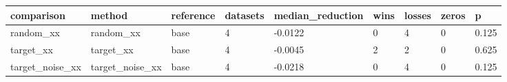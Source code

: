 \begin{tabular}{lllllllll}
\toprule
comparison & method & reference & datasets & median\_reduction & wins & losses & zeros & p \\
\midrule
random\_xx & random\_xx & base & 4 & -0.0122 & 0 & 4 & 0 & 0.125 \\
target\_xx & target\_xx & base & 4 & -0.0045 & 2 & 2 & 0 & 0.625 \\
target\_noise\_xx & target\_noise\_xx & base & 4 & -0.0218 & 0 & 4 & 0 & 0.125 \\
\bottomrule
\end{tabular}

